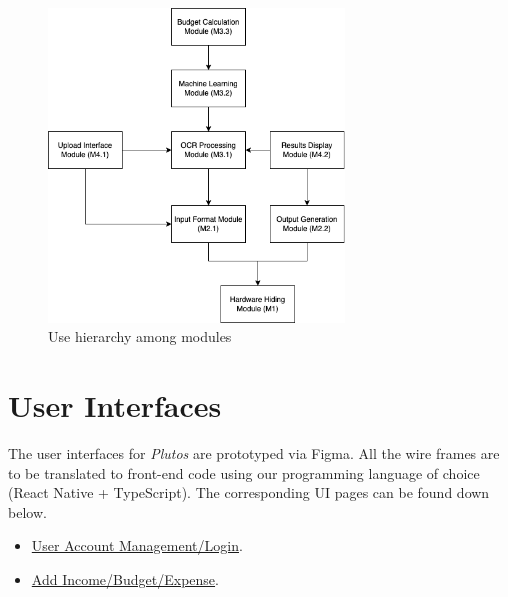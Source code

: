 \documentclass[12pt, titlepage]{article}
\begin{document}

\begin{figure}[H]
\centering
\includegraphics[width=0.7\textwidth]{UsesHierarchy.png}
\caption{Use hierarchy among modules}
\label{FigUH}
\end{figure}


\newpage

\section{User Interfaces}

The user interfaces for \textit{Plutos} are prototyped via Figma. All the wire frames are to be translated to front-end code using our programming language of choice (React Native + TypeScript).
The corresponding UI pages can be found down below.
 
\begin{itemize}
	\item \href{https://www.figma.com/design/W2B31TC8L3tgjZm8189vqm/Plutos?node-id=29-45&t=gfR0b4FgWOY40Jt2-1}{User Account Management/Login}.
	\item \href{https://www.figma.com/design/W2B31TC8L3tgjZm8189vqm/Plutos?node-id=112-2933&t=ZbbX5sZyfK6XT3DZ-1}{Add Income/Budget/Expense}.
\end{itemize}
\end{document}
